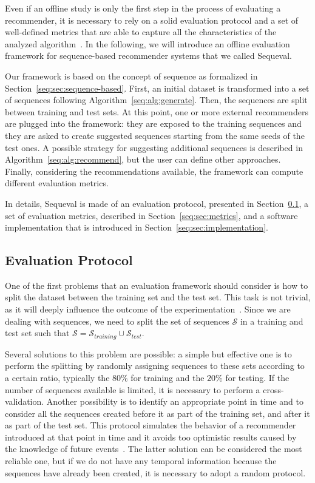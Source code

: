 Even if an offline study is only the first step in the process of evaluating a recommender, it is necessary to rely on a solid evaluation protocol and a set of well-defined metrics that are able to capture all the characteristics of the analyzed algorithm~\cite{Ge2010}. In the following, we will introduce an offline evaluation framework for sequence-based recommender systems that we called Sequeval.

Our framework is based on the concept of sequence as formalized in Section~\ref{seq:sec:sequence-based}. First, an initial dataset is transformed into a set of sequences following Algorithm~\ref{seq:alg:generate}. Then, the sequences are split between training and test sets. At this point, one or more external recommenders are plugged into the framework: they are exposed to the training sequences and they are asked to create suggested sequences starting from the same seeds of the test ones. A possible strategy for suggesting additional sequences is described in Algorithm~\ref{seq:alg:recommend}, but the user can define other approaches. Finally, considering the recommendations available, the framework can compute different evaluation metrics.

In details, Sequeval is made of an evaluation protocol, presented in Section~\ref{seq:sec:protocol}, a set of evaluation metrics, described in Section~\ref{seq:sec:metrics}, and a software implementation that is introduced in Section~\ref{seq:sec:implementation}.

\subsection{Evaluation Protocol}
\label{seq:sec:protocol}

One of the first problems that an evaluation framework should consider is how to split the dataset between the training set and the test set. This task is not trivial, as it will deeply influence the outcome of the experimentation~\cite{Said2014}. Since we are dealing with sequences, we need to split the set of sequences $\mathcal{S}$ in a training and test set such that $\mathcal{S} = \mathcal{S}_{training} \cup \mathcal{S}_{test}$.

Several solutions to this problem are possible: a simple but effective one is to perform the splitting by randomly assigning sequences to these sets according to a certain ratio, typically the $80\%$ for training and the $20\%$ for testing. If the number of sequences available is limited, it is necessary to perform a cross-validation. Another possibility is to identify an appropriate point in time and to consider all the sequences created before it as part of the training set, and after it as part of the test set. This protocol simulates the behavior of a recommender introduced at that point in time and it avoids too optimistic results caused by the knowledge of future events~\cite{Paraschakis2015}. The latter solution can be considered the most reliable one, but if we do not have any temporal information because the sequences have already been created, it is necessary to adopt a random protocol.

